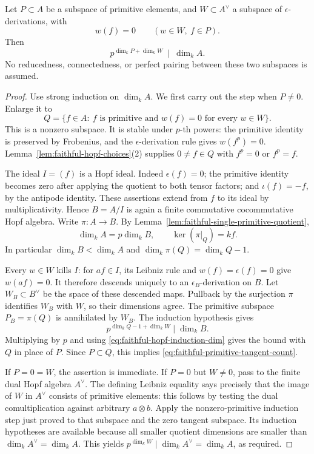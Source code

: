 \begin{srproposition}
\label{prop:faithful-primitive-tangent-count}
Let \(P\subset A\) be a subspace of primitive elements, and
\(W\subset A^\vee\) a subspace of \(\epsilon\)-derivations, with
\[
 w(f)=0\qquad(w\in W,\ f\in P).
\]
Then
\[
 p^{\dim_kP+\dim_kW}\ \mid\ \dim_k A .
 \tag{HC5}\label{eq:faithful-primitive-tangent-count}
\]
No reducedness, connectedness, or perfect pairing between these
two subspaces is assumed.
\end{srproposition}
\begin{proof}
Use strong induction on \(\dim_k A\).  We first carry out the step
when \(P\ne0\).  Enlarge it to
\[
 Q=\{f\in A:\ f\text{ is primitive and }w(f)=0
                    \text{ for every }w\in W\}.
\]
This is a nonzero subspace.  It is stable under \(p\)-th powers:
the primitive identity is preserved by Frobenius, and the
\(\epsilon\)-derivation rule gives \(w(f^p)=0\).
Lemma~\ref{lem:faithful-hopf-choices}(2) supplies
\(0\ne f\in Q\) with \(f^p=0\) or \(f^p=f\).

The ideal \(I=(f)\) is a Hopf ideal.  Indeed \(\epsilon(f)=0\);
the primitive identity becomes zero after applying the quotient
to both tensor factors; and \(\iota(f)=-f\), by the antipode
identity.  These assertions extend from \(f\) to its ideal by
multiplicativity.  Hence \(B=A/I\) is again a finite commutative
cocommutative Hopf algebra.  Write \(\pi:A\to B\).
By Lemma~\ref{lem:faithful-single-primitive-quotient},
\[
 \dim_kA=p\dim_kB,\qquad
 \ker(\pi|_Q)=kf .
 \tag{HC6}\label{eq:faithful-hopf-induction-dim}
\]
In particular \(\dim_kB<\dim_kA\) and
\(\dim_k\pi(Q)=\dim_kQ-1\).

Every \(w\in W\) kills \(I\): for \(af\in I\), its Leibniz rule
and \(w(f)=\epsilon(f)=0\) give \(w(af)=0\).
It therefore descends uniquely to an \(\epsilon_B\)-derivation on
\(B\).  Let \(W_B\subset B^\vee\) be the space of these descended
maps.  Pullback by the surjection \(\pi\) identifies \(W_B\) with
\(W\), so their dimensions agree.  The primitive subspace
\(P_B=\pi(Q)\) is annihilated by \(W_B\).
The induction hypothesis gives
\[
 p^{\dim_kQ-1+\dim_kW}\mid\dim_kB.
\]
Multiplying by \(p\) and using \eqref{eq:faithful-hopf-induction-dim}
gives the bound with \(Q\) in place of \(P\).
Since \(P\subset Q\), this implies \eqref{eq:faithful-primitive-tangent-count}.

If \(P=0=W\), the assertion is immediate.  If \(P=0\) but \(W\ne0\),
pass to the finite dual Hopf algebra \(A^\vee\).  The defining
Leibniz equality says precisely that the image of \(W\) in
\(A^\vee\) consists of primitive elements: this follows by testing
the dual comultiplication against arbitrary \(a\otimes b\).
Apply the nonzero-primitive induction step just proved to that
subspace and the zero tangent subspace.  Its induction hypotheses
are available because all smaller quotient dimensions are smaller
than \(\dim_kA^\vee=\dim_kA\).
This yields \(p^{\dim_kW}\mid\dim_kA^\vee=\dim_kA\), as required.
\end{proof}

